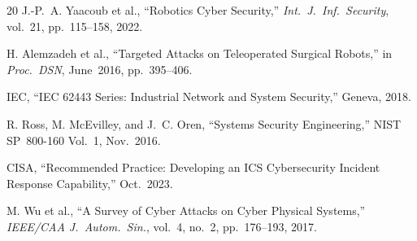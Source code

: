 \documentclass[journal]{IEEEtran}
\begin{document}
\begin{thebibliography}{20}
J.-P.~A. Yaacoub et al., ``Robotics Cyber Security,'' \textit{Int.\ J.\ Inf.\ Security}, vol.~21, pp.~115--158, 2022.

H. Alemzadeh et al., ``Targeted Attacks on Teleoperated Surgical Robots,'' in \textit{Proc.\ DSN}, June~2016, pp.~395--406.

IEC, ``IEC 62443 Series: Industrial Network and System Security,'' Geneva, 2018.

R. Ross, M. McEvilley, and J.~C. Oren, ``Systems Security Engineering,'' NIST SP~800-160 Vol.~1, Nov.~2016.

CISA, ``Recommended Practice: Developing an ICS Cybersecurity Incident Response Capability,'' Oct.~2023.

M. Wu et al., ``A Survey of Cyber Attacks on Cyber Physical Systems,'' \textit{IEEE/CAA J.\ Autom.\ Sin.}, vol.~4, no.~2, pp.~176--193, 2017.

\end{thebibliography}
\end{document}
